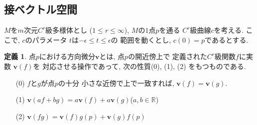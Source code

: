 \documentclass[a4j,12pt]{jarticle}
\theoremstyle{definition}
\newtheorem{definition}[theorem]{定義}
\begin{document}
\subsection{接ベクトル空間}
$M$を$m$次元$C^r$級多様体とし 
($1\leq r\leq \infty$), $M$の$1$点$p$を通る
$C^r$級曲線$c$を考える. ここで, $c$のパラメータ
$t$は$-\epsilon \leq t\leq \epsilon$の
範囲を動くとし, $c(0)=p$であるとする. 
\begin{definition}\label{def:directional derivative}
    点$p$における方向微分$\boldsymbol{v}$とは, 
    点$p$の開近傍上で
    定義された$C^r$級関数$f$に実数
    $\boldsymbol{v}(f)$を
    対応させる操作であって, 次の性質(0), (1), (2)
    をもつものである. 
    \begin{itemize}
        \item[(0)]$f$と$g$が点$p$の十分
        小さな近傍で上で一致すれば, 
        $\boldsymbol{v}(f)=\boldsymbol{v}(g)$. 
        \item[(1)]$\boldsymbol{v}(af+bg)
        =a\boldsymbol{v}(f)+
        a\boldsymbol{v}(g)$($a,b\in \mathbb{R}$)
        \item[(2)]$\boldsymbol{v}(fg)=
        \boldsymbol{v}(f)g(p)+
        \boldsymbol{v}(g)f(p)$
    \end{itemize}
\end{definition}
\end{document}
